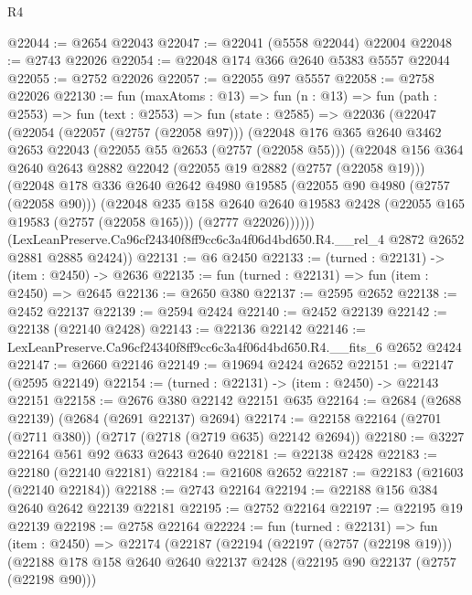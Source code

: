 \begin{lexlean}{R4}
\begin{coremodule}
@22044 := @2654 @22043
@22047 := @22041 (@5558 @22044) @22004
@22048 := @2743 @22026
@22054 := @22048 @174 @366 @2640 @5383 @5557 @22044
@22055 := @2752 @22026
@22057 := @22055 @97 @5557
@22058 := @2758 @22026
@22130 := fun (maxAtoms : @13) =>
  fun (n : @13) =>
  fun (path : @2553) =>
  fun (text : @2553) =>
  fun (state : @2585) =>
  @22036
    (@22047
      (@22054
        (@22057 (@2757 (@22058 @97)))
        (@22048
          @176
          @365
          @2640
          @3462
          @2653
          @22043
          (@22055 @55 @2653 (@2757 (@22058 @55)))
          (@22048
            @156
            @364
            @2640
            @2643
            @2882
            @22042
            (@22055 @19 @2882 (@2757 (@22058 @19)))
            (@22048
              @178
              @336
              @2640
              @2642
              @4980
              @19585
              (@22055 @90 @4980 (@2757 (@22058 @90)))
              (@22048
                @235
                @158
                @2640
                @2640
                @19583
                @2428
                (@22055 @165 @19583 (@2757 (@22058 @165)))
                (@2777 @22026))))))
      (LexLeanPreserve.Ca96cf24340f8ff9cc6c3a4f06d4bd650.R4.__rel_4 @2872 @2652 @2881 @2885 @2424))
@22131 := @6 @2450
@22133 := (turned : @22131) -> (item : @2450) -> @2636
@22135 := fun (turned : @22131) => fun (item : @2450) => @2645
@22136 := @2650 @380
@22137 := @2595 @2652
@22138 := @2452 @22137
@22139 := @2594 @2424
@22140 := @2452 @22139
@22142 := @22138 (@22140 @2428)
@22143 := @22136 @22142
@22146 := LexLeanPreserve.Ca96cf24340f8ff9cc6c3a4f06d4bd650.R4.__fits_6 @2652 @2424
@22147 := @2660 @22146
@22149 := @19694 @2424 @2652
@22151 := @22147 (@2595 @22149)
@22154 := (turned : @22131) -> (item : @2450) -> @22143 @22151
@22158 := @2676 @380 @22142 @22151 @635
@22164 := @2684 (@2688 @22139) (@2684 (@2691 @22137) @2694)
@22174 := @22158 @22164 (@2701 (@2711 @380)) (@2717 (@2718 (@2719 @635) @22142 @2694))
@22180 := @3227 @22164 @561 @92 @633 @2643 @2640
@22181 := @22138 @2428
@22183 := @22180 (@22140 @22181)
@22184 := @21608 @2652
@22187 := @22183 (@21603 (@22140 @22184))
@22188 := @2743 @22164
@22194 := @22188 @156 @384 @2640 @2642 @22139 @22181
@22195 := @2752 @22164
@22197 := @22195 @19 @22139
@22198 := @2758 @22164
@22224 := fun (turned : @22131) =>
  fun (item : @2450) =>
  @22174
    (@22187
      (@22194
        (@22197 (@2757 (@22198 @19)))
        (@22188
          @178
          @158
          @2640
          @2640
          @22137
          @2428
          (@22195 @90 @22137 (@2757 (@22198 @90)))

\end{coremodule}
\end{lexlean}
